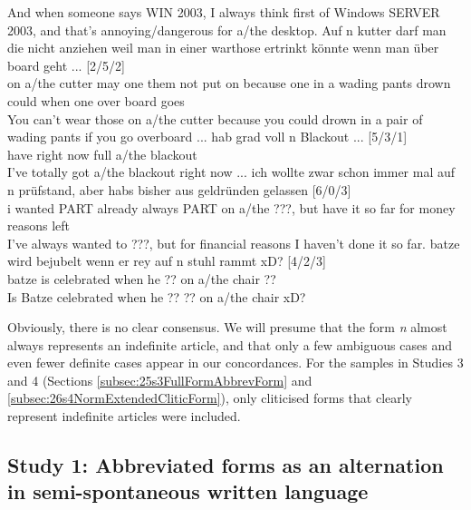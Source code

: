 \begin{exe}
\begin{xlist}
	\trans And when someone says WIN 2003, I always think first of Windows SERVER 2003, and that's annoying/dangerous for a/the desktop.
	\ex\label{ex:0019}\gll Auf n kutter darf man die nicht anziehen weil man in einer warthose ertrinkt könnte wenn man über board geht ... [2/5/2]\\
	on a/the cutter may one them not {put on} because one in a {wading pants} drown could when one over board goes\\
	\trans You can't wear those on a/the cutter because you could drown in a pair of wading pants if you go overboard ...
	\ex\label{ex:0020}\gll hab grad voll n Blackout ... [5/3/1]\\
	have {right now} full a/the blackout\\
	\trans I've totally got a/the blackout right now ...
	\ex\label{ex:0021}\gll ich wollte zwar schon immer mal auf n prüfstand, aber habs bisher aus geldründen gelassen [6/0/3]\\
	i wanted PART already always PART on a/the ???, but {have it} {so far} for {money reasons} left\\
	\trans I've always wanted to ???, but for financial reasons I haven't done it so far.
	\ex\label{ex:0022}\gll batze wird bejubelt wenn er rey auf n stuhl rammt xD? [4/2/3]\\
	batze is celebrated when he ?? on a/the chair ??\\
	Is Batze celebrated when he ?? ?? on a/the chair xD? %
	\end{xlist}
\end{exe}

Obviously, there is no clear consensus.
We will presume that the form \textit{n} almost always represents an indefinite article, and that only a few ambiguous cases and even fewer definite cases appear in our concordances.
For the samples in Studies 3 and 4 (Sections \ref{subsec:25s3FullFormAbbrevForm} and \ref{subsec:26s4NormExtendedCliticForm}), only cliticised forms that clearly represent indefinite articles were included. 

\subsection[Study 1: Abbreviated forms as an alternation]{Study 1: Abbreviated forms as an alternation in semi-spontaneous written language}
\label{subsec:23s1Alternation}

